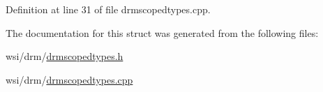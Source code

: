 Definition at line 31 of file drmscopedtypes.\+cpp.


\begin{DoxyCode}{0}
\end{DoxyCode}


The documentation for this struct was generated from the following files\+:\begin{DoxyCompactItemize}
\item 
wsi/drm/\mbox{\hyperlink{drmscopedtypes_8h}{drmscopedtypes.\+h}}\item 
wsi/drm/\mbox{\hyperlink{drmscopedtypes_8cpp}{drmscopedtypes.\+cpp}}\end{DoxyCompactItemize}
